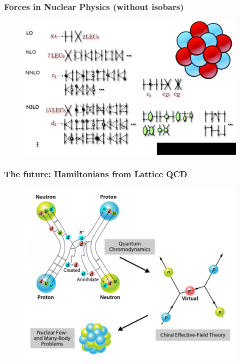 \documentclass[compress]{beamer}
\begin{document}
\frame
{
  \frametitle{Forces in Nuclear Physics (without isobars)}
      \begin{figure}[htp]
        \centering	
        \includegraphics[width=1.0\textwidth]{Figures/forces.png}
      \end{figure}
}







\frame
{
  \frametitle{The future: Hamiltonians from Lattice QCD}
      \begin{figure}[htp]
        \centering	
        	\includegraphics[width=1.0\textwidth]{Figures/future.png}
      \end{figure}
}
\end{document}
